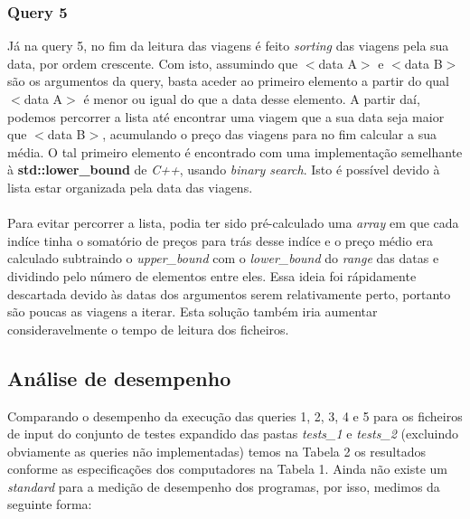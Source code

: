 \documentclass{article}
\begin{document}
        \subsubsection{Query 5}
            \newcommand{\param}[1]{$<${#1}$>$}
            Já na query 5, no fim da leitura das viagens é feito \emph{sorting}
            das viagens pela sua data, por ordem crescente. Com isto, assumindo 
            que \param{data A} e \param{data B} são os argumentos da query, 
            basta aceder ao primeiro elemento a partir do qual \param{data A} é 
            menor ou igual do que a data desse elemento. A partir daí, podemos
            percorrer a lista até encontrar uma viagem que a sua data seja
            maior que \param{data B}, acumulando o preço das viagens para no fim
            calcular a sua média. O tal primeiro elemento é encontrado com
            uma implementação semelhante à \textbf{std::lower\_bound} de \emph{C++},
            usando \emph{binary search}. Isto é possível devido à lista estar
            organizada pela data das viagens.
            \\
            \\Para evitar percorrer a lista, podia ter sido pré-calculado uma \emph{array}
            em que cada indíce tinha o somatório de preços para trás desse indíce
            e o preço médio era calculado subtraindo o \emph{upper\_bound}
            com o \emph{lower\_bound} do \emph{range} das datas e dividindo pelo 
            número de elementos entre eles. Essa ideia foi rápidamente descartada
            devido às datas dos argumentos serem relativamente perto, portanto
            são poucas as viagens a iterar. Esta solução também iria aumentar 
            consideravelmente o tempo de leitura dos ficheiros.

        \newpage
        \subsection{Análise de desempenho}
            Comparando o desempenho da execução das queries 1, 2, 3, 4 e 5 para 
            os ficheiros de input do conjunto de testes expandido das pastas 
            \emph{tests\_1} e \emph{tests\_2} (excluindo obviamente as queries não 
            implementadas) temos na Tabela 2 os resultados conforme as 
            especificações dos computadores na Tabela 1. Ainda não existe um
            \emph{standard} para a medição de desempenho dos programas, por isso,
            medimos da seguinte forma:
\end{document}
